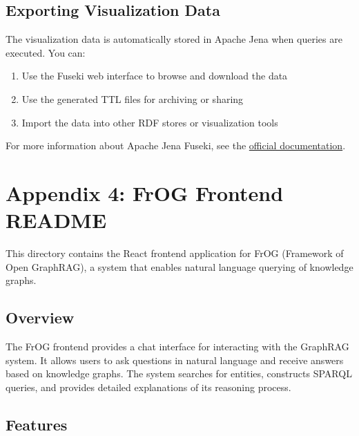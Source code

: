\section*{Exporting Visualization Data}

The visualization data is automatically stored in Apache Jena when queries are executed. You can:

\begin{enumerate}
    \item Use the Fuseki web interface to browse and download the data
    \item Use the generated TTL files for archiving or sharing
    \item Import the data into other RDF stores or visualization tools
\end{enumerate}

For more information about Apache Jena Fuseki, see the \href{https://jena.apache.org/documentation/fuseki2/}{official documentation}.

\chapter*{Appendix 4: FrOG Frontend README}
\label{sec:frog-frontend-readme}

This directory contains the React frontend application for FrOG (Framework of Open GraphRAG), a system that enables natural language querying of knowledge graphs.

\section*{Overview}

The FrOG frontend provides a chat interface for interacting with the GraphRAG system. It allows users to ask questions in natural language and receive answers based on knowledge graphs. The system searches for entities, constructs SPARQL queries, and provides detailed explanations of its reasoning process.

\section*{Features}

